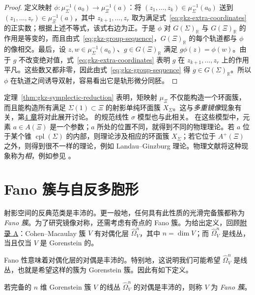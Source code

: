 \begin{proof}
定义映射 $\phi:\mu_\Sigma^{-1}(a_0)\to\mu_\Xi^{-1}(a)$：将 $(z_1,\ldots,z_k)\in\mu_\Sigma^{-1}(a_0)$ 送到 $(z_1,\ldots,z_r)\in\mu_\Xi^{-1}(a)$，其中 $z_{k+1},\ldots,z_r$ 取为满足式~\eqref{eq:gkz-extra-coordinates} 的正实数；根据上述不等式，该式右边为正。于是 $\phi$ 对 $G(\Sigma)_{\mathbb R}$ 与 $G(\Xi)_{\mathbb R}$ 的作用是等变的，而且由式~\eqref{eq:gkz-group-sequence}，$G(\Xi)_{\mathbb R}$ 的每个轨道都与 $\phi$ 的像相交。最后，设 $z,w\in\mu_\Sigma^{-1}(a_0)$、$g\in G(\Xi)_{\mathbb R}$ 满足 $g\phi(z)=\phi(w)$。由于 $g$ 不改变绝对值，式~\eqref{eq:gkz-extra-coordinates} 表明 $g$ 在 $z_{k+1},\ldots,z_r$ 上的作用平凡。这些数又都非零，因此由式~\eqref{eq:gkz-group-sequence} 得 $g\in G(\Sigma)_{\mathbb R}$。所以 $\phi$ 在轨道之间诱导双射，容易看出它是轨形微分同胚。
\end{proof}

定理~\ref{thm:gkz-symplectic-reduction} 表明，矩映射 $\mu_\Xi$ 不仅能构造一个环面簇，而且能构造所有满足 $\Sigma(1)\subset\Xi$ 的射影单纯环面簇 $X_\Sigma$。这与\emph{多重镜像}现象有关，第\hyperref[chap:mirror-constructions]{4 章}将对此展开讨论。 的规范线性 $\sigma$ 模型也与此相关。
在这些模型中，元素 $a\in A(\Xi)$ 是一个参数；$a$ 所处的位置不同，就得到不同的物理理论。若 $a$ 位于某个锥 $\operatorname{cpl}(\Sigma)$ 的内部，则理论涉及相应的环面簇 $X_\Sigma$；若它位于 $A^+(\Xi)$ 之外，则得到很不一样的理论，例如 Landau--Ginzburg 理论。物理文献将这种现象称为\emph{相}，例如参见 。

\section{Fano 簇与自反多胞形}\label{sec:fano-reflexive}

射影空间的反典范类是丰沛的。更一般地，任何具有此性质的光滑完备簇都称为 \emph{Fano 簇}。为了研究镜像对称，还需考虑有奇点的 Fano 簇。为给出定义，回顾\hyperref[app:singular-varieties]{附录 A}：Cohen--Macaulay 簇 $V$ 有对偶化层 $\widehat\Omega_V^n$，其中 $n=\dim V$；而 $\widehat\Omega_V^n$ 是线丛，当且仅当 $V$ 是 Gorenstein 的。

Fano 性意味着对偶化层的对偶是丰沛的。特别地，这说明我们可能希望 $\widehat\Omega_V^n$ 是线丛，也就是希望这样的簇为 Gorenstein 簇。因此有如下定义。
\begin{definition}\label{def:fano}
若完备的 $n$ 维 Gorenstein 簇 $V$ 的线丛 $\widehat\Omega_V^n$ 的对偶是丰沛的，则称 $V$ 为 \emph{Fano 簇}。
\end{definition}

